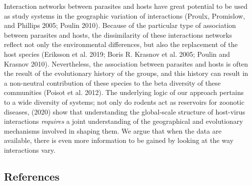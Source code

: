 \documentclass[11pt]{article}
\begin{document}
Interaction networks between parasites and hosts have great potential to
be used as study systems in the geographic variation of interactions
(Proulx, Promislow, and Phillips 2005; Poulin 2010). Because of the
particular type of association between parasites and hosts, the
dissimilarity of these interactions networks reflect not only the
environmental differences, but also the replacement of the host species
(Eriksson et al. 2019; Boris R. Krasnov et al. 2005; Poulin and Krasnov
2010). Nevertheless, the association between parasites and hosts is
often the result of the evolutionary history of the groups, and this
history can result in a non-neutral contribution of these species to the
beta diversity of these communities (Poisot et al. 2012). The underlying
logic of our approach pertains to a wide diversity of systems; not only
do rodents act as reservoirs for zoonotic diseases, (2020) show that
understanding the global-scale structure of host-virus interactions
\emph{requires} a joint understanding of the geographical and
evolutionary mechanisms involved in shaping them. We argue that when the
data are available, there is even more information to be gained by
looking at the way interactions vary.

\hypertarget{references}{%
\subsection*{References}\label{references}}
\end{document}
